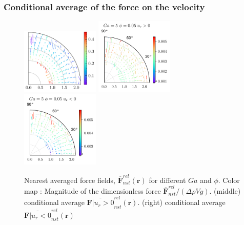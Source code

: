 \documentclass{sintefbeamer}
\newcommand{\nstrelavg}[1]{\overline{#1}_{nst}^{rel}}
\begin{document}
\begin{frame}
  \frametitle{Conditional average of the force on the velocity}
  \begin{figure}
    \centering
    \includegraphics[width=0.33\textwidth]{image/HOMOGENEOUS/fDrop/F_mu_r_0_1_Ga_5_PHI_0_05.pdf}
    \includegraphics[width=0.33\textwidth]{image/HOMOGENEOUS/fDrop/Fpos_mu_r_0_1_Ga_5_PHI_0_05.pdf}
    \includegraphics[width=0.33\textwidth]{image/HOMOGENEOUS/fDrop/Fneg_mu_r_0_1_Ga_5_PHI_0_05.pdf}
    \caption{Nearest averaged force fields, $\nstrelavg{\textbf{F}}(\textbf{r})$ for different $Ga$ and $\phi$. 
    Color map : Magnitude of the dimensionless force  $\nstrelavg{\textbf{F}} / (\Delta \rho V g)$.
    (middle) conditional average  $\nstrelavg{\textbf{F}| u_r > 0}(\textbf{r})$. 
    (right) conditional average  $\nstrelavg{\textbf{F}| u_r < 0}(\textbf{r})$ }
  \end{figure}
\end{frame}
\end{document}
